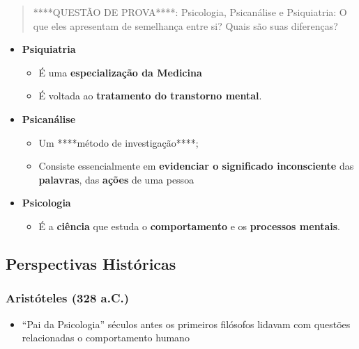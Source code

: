 \documentclass[
]{book}
\providecommand{\tightlist}{%
  \setlength{\itemsep}{0pt}\setlength{\parskip}{0pt}}
\begin{document}
\begin{quote}
****QUESTÃO DE PROVA****: Psicologia, Psicanálise e Psiquiatria: O que eles apresentam
de semelhança entre si? Quais são suas diferenças?
\end{quote}

\begin{itemize}
\tightlist
\item
  \textbf{Psiquiatria}

  \begin{itemize}
  \tightlist
  \item
    É uma \textbf{especialização da Medicina}
  \item
    É voltada ao \textbf{tratamento do transtorno mental}.
  \end{itemize}
\item
  \textbf{Psicanálise}

  \begin{itemize}
  \tightlist
  \item
    Um ****método de investigação****;
  \item
    Consiste essencialmente em \textbf{evidenciar o significado inconsciente} das \textbf{palavras}, das \textbf{ações} de uma pessoa
  \end{itemize}
\item
  \textbf{Psicologia}

  \begin{itemize}
  \tightlist
  \item
    É a \textbf{ciência} que estuda o \textbf{comportamento} e os \textbf{processos mentais}.
  \end{itemize}
\end{itemize}

\hypertarget{perspectivas-histuxf3ricas}{%
\subsection{Perspectivas Históricas}\label{perspectivas-histuxf3ricas}}

\hypertarget{aristuxf3teles-328-a.c.}{%
\subsubsection{Aristóteles (328 a.C.)}\label{aristuxf3teles-328-a.c.}}

\begin{itemize}
\tightlist
\item
  ``Pai da Psicologia'' séculos antes os primeiros filósofos lidavam com questões relacionadas o comportamento humano
\end{itemize}
\end{document}
